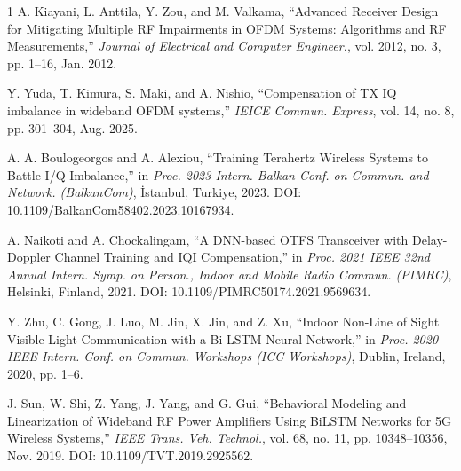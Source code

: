 \documentclass[lettersize,journal]{IEEEtran}
\begin{document}
\begin{thebibliography}{1}
A. Kiayani, L. Anttila, Y. Zou, and M. Valkama, ``Advanced Receiver Design for Mitigating Multiple RF Impairments in OFDM Systems: Algorithms and RF Measurements,'' \textit{Journal of Electrical and Computer Engineer.}, vol. 2012, no. 3, pp. 1--16, Jan. 2012.

Y. Yuda, T. Kimura, S. Maki, and A. Nishio, ``Compensation of TX IQ imbalance in wideband OFDM systems,'' \textit{IEICE Commun. Express}, vol. 14, no. 8, pp. 301--304, Aug. 2025.

A. A. Boulogeorgos and A. Alexiou, ``Training Terahertz Wireless Systems to Battle I/Q Imbalance,'' in \textit{Proc. 2023 Intern. Balkan Conf. on Commun. and Network. (BalkanCom)}, İstanbul, Turkiye, 2023. DOI: 10.1109/BalkanCom58402.2023.10167934.

A. Naikoti and A. Chockalingam, ``A DNN-based OTFS Transceiver with Delay-Doppler Channel Training and IQI Compensation,'' in \textit{Proc. 2021 IEEE 32nd Annual Intern. Symp. on Person., Indoor and Mobile Radio Commun. (PIMRC)}, Helsinki, Finland, 2021. DOI: 10.1109/PIMRC50174.2021.9569634.

Y. Zhu, C. Gong, J. Luo, M. Jin, X. Jin, and Z. Xu, ``Indoor Non-Line of Sight Visible Light Communication with a Bi-LSTM Neural Network,'' in \textit{Proc. 2020 IEEE Intern. Conf. on Commun. Workshops (ICC Workshops)}, Dublin, Ireland, 2020, pp. 1--6.



J. Sun, W. Shi, Z. Yang, J. Yang, and G. Gui, ``Behavioral Modeling and Linearization of Wideband RF Power Amplifiers Using BiLSTM Networks for 5G Wireless Systems,'' \textit{IEEE Trans. Veh. Technol.}, vol. 68, no. 11, pp. 10348--10356, Nov. 2019. DOI: 10.1109/TVT.2019.2925562.

\end{thebibliography}

\vfill
\end{document}
